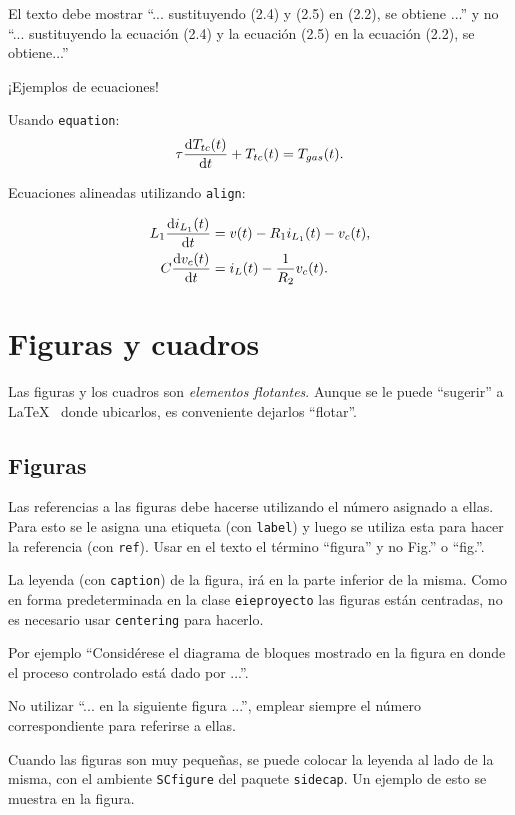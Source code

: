 El texto debe mostrar ``... sustituyendo (2.4) y (2.5) en (2.2), se obtiene ...'' y no ``... sustituyendo la ecuación (2.4) y la ecuación (2.5) en la ecuación (2.2), se obtiene...''  

¡Ejemplos de ecuaciones!

Usando \texttt{equation}:
\begin{equation}
	\tau \frac{\mathrm{d} T_{tc}(t)}{\mathrm{d} t} + T_{tc}(t) = T_{gas}(t).
\end{equation}

Ecuaciones alineadas utilizando \texttt{align}:

\begin{align}
	L_1 \frac{\mathrm{d} i_{L_1} (t)}{\mathrm{d} t} &= v(t) - R_1 i_{L_1}(t) - v_c(t), \\
	C \frac{\mathrm{d} v_c (t)}{\mathrm{d} t} &= i_L(t)- \frac{1}{R_2} v_c(t).
\end{align}

\section{Figuras y cuadros}
Las figuras y los cuadros son \emph{elementos flotantes}. Aunque se le puede ``sugerir'' a \LaTeX~ donde ubicarlos, es conveniente dejarlos ``flotar''.

\subsection{Figuras}
Las referencias a las figuras debe hacerse utilizando el número asignado a ellas.  Para esto se le asigna una etiqueta (con \texttt{label}) y luego se utiliza esta para hacer la referencia (con \texttt{ref}).  Usar en el texto el término ``figura'' y no Fig.'' o ``fig.''.

La leyenda (con \texttt{caption}) de la figura, irá en la parte inferior de la misma.  Como en forma predeterminada en la clase \texttt{eieproyecto} las figuras están centradas, no es necesario usar \texttt{centering} para hacerlo.

Por ejemplo ``Considérese el diagrama de bloques mostrado en la figura en donde el proceso controlado está dado por ...''.

No utilizar ``... en la siguiente figura ...'', emplear siempre el número correspondiente para referirse a ellas.

Cuando las figuras son muy pequeñas, se puede colocar la leyenda al lado de la misma, con el ambiente \texttt{SCfigure} del paquete \texttt{sidecap}.  Un ejemplo de esto se muestra en la figura.

